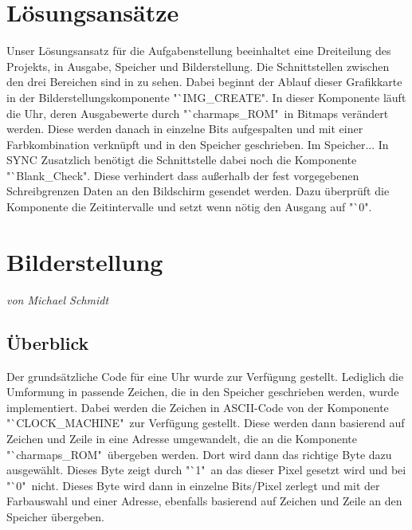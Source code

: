 \documentclass[12pt,a4paper,bibliography=totoc,listof=totoc]{scrartcl}
\begin{document}
\section {Lösungsansätze}
 
Unser Lösungsansatz für die Aufgabenstellung beeinhaltet eine Dreiteilung des Projekts, in Ausgabe, Speicher und Bilderstellung. Die Schnittstellen 
zwischen den drei Bereichen sind in %
zu sehen. 
Dabei beginnt der Ablauf dieser Grafikkarte in der Bilderstellungskomponente "`IMG\_CREATE". In dieser Komponente läuft die Uhr, deren Ausgabewerte 
durch "`charmaps\_ROM"\, in Bitmaps verändert werden. Diese werden danach in einzelne Bits aufgespalten und mit einer Farbkombination verknüpft 
und in den Speicher geschrieben. 
\newline 
Im Speicher...
\newline
In SYNC
\newline
Zusatzlich benötigt die Schnittstelle dabei noch die Komponente "`Blank\_Check". Diese verhindert dass außerhalb der fest vorgegebenen Schreibgrenzen
Daten an den Bildschirm gesendet werden. Dazu überprüft die Komponente die Zeitintervalle und setzt wenn nötig den Ausgang auf "`0".


\pagebreak
\section{Bilderstellung}
\textit{von Michael Schmidt}
\subsection{Überblick}
Der grundsätzliche Code für eine Uhr wurde zur Verfügung gestellt. Lediglich die Umformung in passende Zeichen, die in den Speicher geschrieben 
werden, wurde implementiert. Dabei werden die Zeichen in ASCII-Code von der Komponente "`CLOCK\_MACHINE" \,zur Verfügung gestellt. Diese werden 
dann basierend auf Zeichen und Zeile in eine Adresse umgewandelt, die an die Komponente "`charmaps\_ROM"\, übergeben werden. Dort wird dann das 
richtige Byte dazu ausgewählt. Dieses Byte zeigt durch "`1" \,an das dieser Pixel gesetzt wird und bei "`0" \,nicht. Dieses Byte wird dann in einzelne
Bits/Pixel zerlegt und mit der Farbauswahl und einer Adresse, ebenfalls basierend auf Zeichen und Zeile an den Speicher übergeben. 
\end{document}
